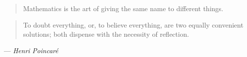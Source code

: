 %
\cleardoublepage
\thispagestyle{empty}

\begin{quote}
\noindent Mathematics is the art of giving the same name to different things.
\end{quote}
\vspace{0.5 cm}
\begin{quote}
\noindent To doubt everything, or, to believe everything, are two equally convenient solutions; both dispense with the necessity of reflection.
\end{quote}
\vspace{1cm}
--- \emph{Henri Poincaré}

\clearemptydoublepage

